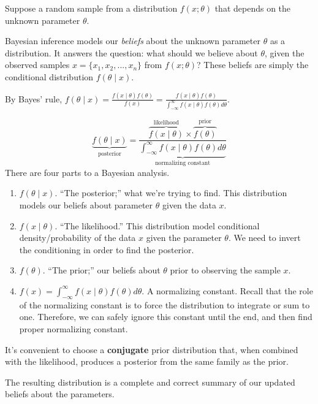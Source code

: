 \documentclass[
]{book}
\providecommand{\tightlist}{%
  \setlength{\itemsep}{0pt}\setlength{\parskip}{0pt}}
\begin{document}
Suppose a random sample from a distribution \(f(x; \theta)\) that depends on the unknown parameter \(\theta\).

Bayesian inference models our \emph{beliefs} about the unknown parameter \(\theta\) as a distribution. It answers the question: what should we believe about \(\theta\), given the observed samples \(x = \{x_1, x_2, ..., x_n\}\) from \(f(x; \theta)\)? These beliefs are simply the conditional distribution \(f(\theta \mid x)\).

By Bayes' rule, \(\displaystyle f(\theta \mid x) = \frac{f(x \mid \theta)f(\theta)}{f(x)} = \frac{f(x \mid \theta)f(\theta)}{\displaystyle \int_{-\infty}^\infty f(x \mid \theta)f(\theta) d\theta}\).

\[
\displaystyle \underbrace{f(\theta \mid x)}_{\text{posterior}} = \frac{\overbrace{f(x \mid \theta)}^{\text{likelihood}} \times \overbrace{f(\theta)}^{\text{prior}}}{\displaystyle \underbrace{\int_{-\infty}^\infty f(x \mid \theta)f(\theta) d\theta}_{\text{normalizing constant}}}
\]
There are four parts to a Bayesian analysis.

\begin{enumerate}
\def\labelenumi{\arabic{enumi}.}
\tightlist
\item
  \(f(\theta \mid x)\). ``The posterior;'' what we're trying to find. This distribution models our beliefs about parameter \(\theta\) given the data \(x\).
\item
  \(f(x \mid \theta)\). ``The likelihood.'' This distribution model conditional density/probability of the data \(x\) given the parameter \(\theta\). We need to invert the conditioning in order to find the posterior.
\item
  \(f(\theta)\). ``The prior;'' our beliefs about \(\theta\) prior to observing the sample \(x\).
\item
  \(f(x) =\int_{-\infty}^\infty f(x \mid \theta)f(\theta) d\theta\). A normalizing constant. Recall that the role of the normalizing constant is to force the distribution to integrate or sum to one. Therefore, we can safely ignore this constant until the end, and then find proper normalizing constant.
\end{enumerate}

It's convenient to choose a \textbf{conjugate} prior distribution that, when combined with the likelihood, produces a posterior from the same family as the prior.

The resulting distribution is a complete and correct summary of our updated beliefs about the parameters.
\end{document}
